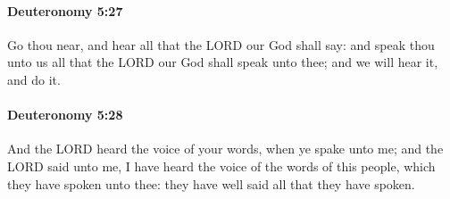		\paragraph{Deuteronomy 5:27} %
			\label{DEUTERONOMY-5-27}

			Go thou near, and hear all that the LORD our God shall say: and speak thou unto us all that the LORD our God shall speak unto thee; and we will hear it, and do it.


		\paragraph{Deuteronomy 5:28} %
			\label{DEUTERONOMY-5-28}

			And the LORD heard the voice of your words, when ye spake unto me; and the LORD said unto me, I have heard the voice of the words of this people, which they have spoken unto thee: they have well said all that they have spoken.

